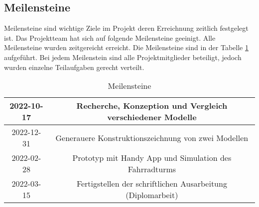\subsection{Meilensteine}

Meilensteine sind wichtige Ziele im Projekt deren Erreichnung zeitlich festgelegt ist. Das Projektteam hat sich auf folgende Meilensteine geeinigt. Alle Meilensteine wurden zeitgereicht erreicht. Die Meilensteine sind in der Tabelle \ref{tab:meilensteine} aufgeführt. Bei jedem Meilenstein sind alle Projektmitglieder beteiligt, jedoch wurden einzelne Teilaufgaben gerecht verteilt.

\begin{table}[H]
  \begin{center}
    \begin{tabular} { |c|c| }
      \hline
      2022-10-17 & Recherche, Konzeption und Vergleich verschiedener Modelle   \\
      \hline
      2022-12-31 & Generauere Konstruktionszeichnung von zwei Modellen         \\
      \hline
      2022-02-28 & Prototyp mit Handy App und Simulation des Fahrradturms      \\
      \hline
      2022-03-15 & Fertigstellen der schriftlichen Ausarbeitung (Diplomarbeit) \\
      \hline
    \end{tabular}
    \caption{Meilensteine}
    \label{tab:meilensteine}
  \end{center}
\end{table}